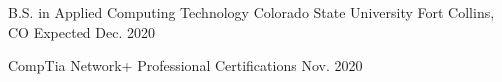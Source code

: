 



\begin{cventries}
  \cventry
    {B.S. in Applied Computing Technology} %
    {Colorado State University} %
    {Fort Collins, CO} %
    {Expected Dec. 2020} %
    {}

  \certentry
    {CompTia Network+} %
    {Professional Certifications} %
    {Nov. 2020} %
	{ }
	{ }
\end{cventries}

